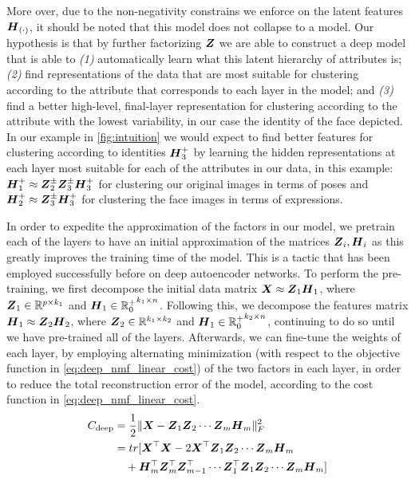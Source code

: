 \documentclass[10pt,journal,compsoc]{IEEEtran}
\providecommand{\norm}[1]{\lVert#1\rVert}
\begin{document}
More over, due to the non-negativity constrains we enforce on the latent features $\boldsymbol{H}_{(\cdot)}$, it should be noted that this model does not collapse to a \seminmf model. Our hypothesis is that by further factorizing $\boldsymbol{Z}$ we are able to construct a deep model that is able to \textit{(1)} automatically learn what this latent hierarchy of attributes is; \textit{(2)} find representations of the data that are most suitable for clustering according to the attribute that corresponds to each layer in the model; and \textit{(3)} find a better high-level, final-layer representation for clustering according to the attribute with the lowest variability, in our case the identity of the face depicted. In our example in \autoref{fig:intuition} we would expect to find better features for clustering according to identities ${\boldsymbol{H}}_3^+$ by learning the hidden representations at each layer most suitable for each of the attributes in our data, in this example: ${\boldsymbol{H}}_1^+\approx{\boldsymbol{Z}}_2^\pm{\boldsymbol{Z}}_3^\pm{\boldsymbol{H}}_3^+$ for clustering  our original images in terms of poses and ${\boldsymbol{H}}_2^+\approx{\boldsymbol{Z}}_3^\pm{\boldsymbol{H}}_3^+$ for clustering the face images in terms of expressions.

\newcommand{\Zs}{{\bs Z}_1 {\bs Z}_2 \cdots {\bs Z}_m}


In order to expedite the approximation of the factors in our model, we pretrain each of the layers to have an initial approximation of the matrices ${\boldsymbol{Z}}_i, {\boldsymbol{H}}_i$  as this greatly improves the training time of the model. This is a tactic that has been employed successfully before \cite{hinton2006reducing} on deep autoencoder networks. To perform the pre-training, we first decompose the initial data matrix ${\boldsymbol X \approx {\boldsymbol{Z}}_1 {\boldsymbol{H}}_1}$, where ${\boldsymbol{Z}}_1 \in \mathbb{R}^{p\times k_1}$ and ${\boldsymbol{H}}_1 \in {\mathbb{R}^+_0}^{k_1\times n}$. Following this, we decompose the features matrix ${\boldsymbol H_1 \approx {\boldsymbol{Z}}_2 \boldsymbol H_2}$, where ${\boldsymbol{Z}}_2 \in \mathbb{R}^{k_1\times k_2}$ and ${\boldsymbol H_1 \in {\mathbb{R}^+_0}^{k_2\times n}}$, continuing to do so until we have pre-trained all of the layers. Afterwards, we can fine-tune the weights of each layer, by employing alternating minimization (with respect to the objective function in \autoref{eq:deep_nmf_linear_cost}) of the two factors in each layer, in order to reduce the total reconstruction error of the model, according to the cost function in \autoref{eq:deep_nmf_linear_cost}.
\begin{align}
\notag C_{\text{deep}} &= \dfrac{1}{2} \norm{\boldX - \Zs \boldH_m}^2_F\\ 
\notag &= tr[\boldX^\top \boldX - 2 \boldX^\top \Zs \boldH_m \\ 
& \quad + \boldH_m^{\top} \ZsT \Zs \boldH_m]
\label{eq:deep_nmf_linear_cost}
\end{align}
\end{document}

